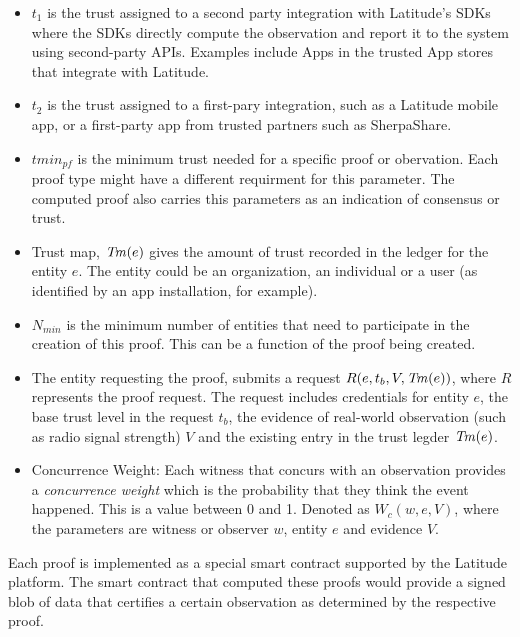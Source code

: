 \begin{itemize}
    \item $t_1$ is the trust assigned to a second party integration with Latitude's SDKs where the SDKs directly compute the
        observation and report it to the system using second-party APIs. Examples include Apps in the trusted App stores
        that integrate with Latitude.
    \item $t_2$ is the trust assigned to a first-pary integration, such as a Latitude mobile app, or a first-party app
        from trusted partners such as SherpaShare.
    \item $tmin_{pf}$ is the minimum trust needed for a specific proof or obervation. Each proof type might have a
        different requirment for this parameter. The computed proof also carries this parameters as an indication of
        consensus or trust.
    \item Trust map, $\mathit{Tm}(e)$ gives the amount of trust recorded in the ledger for the entity $e$. The entity could be an
        organization, an individual or a user (as identified by an app installation, for example).
    \item $N_{min}$ is the minimum number of entities that need to participate in the creation of this proof. This can
        be a function of the proof being created.
    \item The entity requesting the proof, submits a request $R(e, t_b, V, \mathit{Tm}(e))$, where $R$ represents the proof
        request. The request includes credentials for entity $e$, the base trust level in the request $t_b$, the
        evidence of real-world observation (such as radio signal strength) $V$ and the existing entry in the trust
        legder $\mathit{Tm}(e)$.
    \item Concurrence Weight: Each witness that concurs with an observation provides a {\em concurrence weight} which is
        the probability that they think the event happened. This is a value between 0 and 1. Denoted as $W_c(w, e, V)$,
        where the parameters are witness or observer $w$, entity $e$ and evidence $V$.
\end{itemize}

Each proof is implemented as a special smart contract supported by the Latitude platform. The smart contract that
computed these proofs would provide a signed blob of data that certifies a certain observation as determined by the
respective proof.


